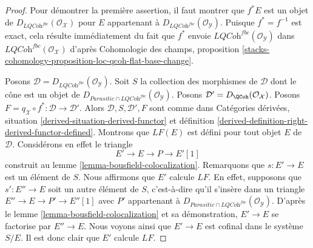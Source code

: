 \begin{proof}
Pour démontrer la première assertion, il faut montrer que $f^*E$ est un objet
de $D_{\textit{LQCoh}^{fbc}}(\mathcal{O}_\mathcal{X})$ pour $E$ appartenant à
$D_{\textit{LQCoh}^{fbc}}(\mathcal{O}_\mathcal{Y})$. Puisque
$f^* = f^{-1}$ est exact, cela résulte immédiatement du fait que $f^*$ envoie
$\textit{LQCoh}^{fbc}(\mathcal{O}_\mathcal{Y})$ dans
$\textit{LQCoh}^{fbc}(\mathcal{O}_\mathcal{X})$ d'après Cohomologie des champs,
proposition
\ref{stacks-cohomology-proposition-loc-qcoh-flat-base-change}.

\medskip\noindent
Posons $\mathcal{D} = D_{\textit{LQCoh}^{fbc}}(\mathcal{O}_\mathcal{Y})$. Soit
$S$ la collection des morphismes de $\mathcal{D}$ dont le cône est un objet de
$D_{\textit{Parasitic} \cap \textit{LQCoh}^{fbc}}(\mathcal{O}_\mathcal{Y})$.
Posons $\mathcal{D}' = D_\QCoh(\mathcal{O}_\mathcal{X})$. Posons
$F = q_\mathcal{X} \circ f^* : \mathcal{D} \to \mathcal{D}'$. Alors
$\mathcal{D}, S, \mathcal{D}', F$ sont comme dans Catégories dérivées,
situation \ref{derived-situation-derived-functor} et définition
\ref{derived-definition-right-derived-functor-defined}. Montrons que $LF(E)$
est défini pour tout objet $E$ de $\mathcal{D}$. Considérons en effet le
triangle
$$
E' \to E \to P \to E'[1]
$$
construit au lemme \ref{lemma-bousfield-colocalization}. Remarquons que
$s : E' \to E$ est un élément de $S$. Nous affirmons que $E'$ calcule $LF$.
En effet, supposons que $s' : E'' \to E$ soit un autre élément de $S$, c'est-à-dire
qu'il s'insère dans un triangle $E'' \to E \to P' \to E''[1]$ avec $P'$
appartenant à
$D_{\textit{Parasitic} \cap \textit{LQCoh}^{fbc}}(\mathcal{O}_\mathcal{Y})$.
D'après le lemme \ref{lemma-bousfield-colocalization} et sa démonstration,
$E' \to E$ se factorise par $E'' \to E$. Nous voyons ainsi que $E' \to E$ est
cofinal dans le système $S/E$. Il est donc clair que $E'$ calcule $LF$.


\end{proof}
